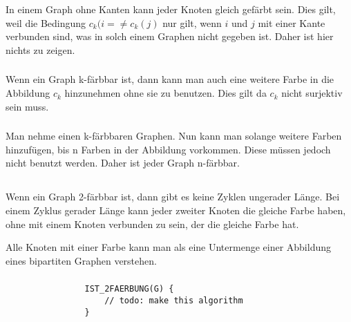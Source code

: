 \documentclass[10pt,a4paper,oneside,ngerman,numbers=noenddot]{scrartcl}
\begin{document}
\section{} %
	\subsection{} %
		\subsubsection{} %
			In einem Graph ohne Kanten kann jeder Knoten gleich gefärbt sein. Dies gilt, weil die Bedingung $c_{k}(i= \neq c_{k}(j)$ nur gilt, wenn $i$ und $j$ mit einer Kante verbunden sind, was in solch einem Graphen nicht gegeben ist. Daher ist hier nichts zu zeigen.
		\subsubsection{} %
			Wenn ein Graph k-färbbar ist, dann kann man auch eine weitere Farbe in die Abbildung $c_{k}$ hinzunehmen ohne sie zu benutzen. Dies gilt da $c_{k}$ nicht surjektiv sein muss.
		\subsubsection{} %
			Man nehme einen k-färbbaren Graphen. Nun kann man solange weitere Farben hinzufügen, bis n Farben in der Abbildung vorkommen. Diese müssen jedoch nicht benutzt werden. Daher ist jeder Graph n-färbbar.
	\subsection{} %
		\subsubsection{} %
			Wenn ein Graph 2-färbbar ist, dann gibt es keine Zyklen ungerader Länge. Bei einem Zyklus gerader Länge kann jeder zweiter Knoten die gleiche Farbe haben, ohne mit einem Knoten verbunden zu sein, der die gleiche Farbe hat.
			
			Alle Knoten mit einer Farbe kann man als eine Untermenge einer Abbildung eines bipartiten Graphen verstehen.
		\subsubsection{} %
			\begin{verbatim}
			    IST_2FAERBUNG(G) {
			        // todo: make this algorithm
			    }
			\end{verbatim}
\end{document}
